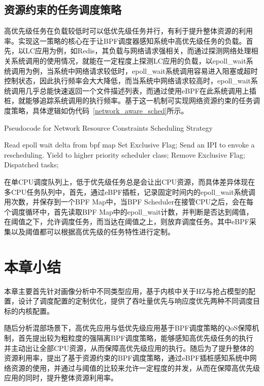\subsection{资源约束的任务调度策略}


高优先级任务在负载较低时可以低优先级任务并行，有利于提升整体资源的利用率。实现这一策略的核心在于让BPF调度器感知系统中高优先级任务的负载。首先，以LC应用为例，如Redis，其负载与网络请求强相关，而通过探测网络处理相关系统调用的使用情况，就能在一定程度上探测LC应用的负载，以epoll\_wait系统调用为例，当系统中网络请求较低时，epoll\_wait系统调用容易进入阻塞或超时控制状态，因此执行频率会大大降低，而当系统中网络请求较高时，epoll\_wait系统调用几乎总能快速返回一个文件描述列表，而通过使用eBPF在此系统调用上插桩，就能够追踪系统调用的执行频率。基于这一机制可实现网络资源约束的任务调度策略，具体逻辑如伪代码~\ref{network_aware_sched}所示。


\begin{algorithm}
    \caption{Pseudocode for Network Resource Constraints Scheduling Strategy}
    \label{alg:network_aware_sched}
    \begin{algorithmic}[1]
        \State Read epoll wait delta from bpf map
            \State Set Exclusive Flag;
                \State Send an IPI to envoke a rescheduling.
            \EndFor
            \State Yield to higher priority scheduler class;
        \EndIf
        \State Remove Exclusive Flag;
        \State Dispatched tasks;
    \EndWhile
    \end{algorithmic}
\end{algorithm}

在单CPU调度队列上，低于优先级任务总是会让出CPU资源，而具体差异体现在多CPU任务队列中，首先，通过eBPF插桩，记录固定时间内的epoll\_wait系统调用次数，并保存到一个BPF Map中，当BPF Scheduler在接管CPU之后，会在每个调度循环中，首先读取BPF Map中的epoll\_wait计数，并判断是否达到阈值，在阈值之下，允许调度任务，而当达在阈值之上，则放弃调度任务。其中eBPF采集以及阈值都可以根据高优先级的任务特性进行定制。


\section{本章小结}

本章主要首先针对画像分析中不同类型应用，基于内核中关于HZ与抢占模型的配置，设计了调度配置的定制优化，提供了吞吐量优先与响应度优先两种不同调度目标的内核配置。

随后分析混部场景下，高优先应用与低优先级应用基于BPF调度策略的QoS保障机制，首先提出较为粗粒度的强隔离BPF调度策略，能够感知高优先级任务的执行并主动出让全部CPU资源，从而保障高优先级应用的执行。随后为了提升整体的资源利用率，提出了基于资源约束的BPF调度策略，通过eBPF插桩感知系统中网络资源的使用，并通过与阈值的比较来允许一定程度的并发，从而在保障高优先级应用的同时，提升整体资源利用率。